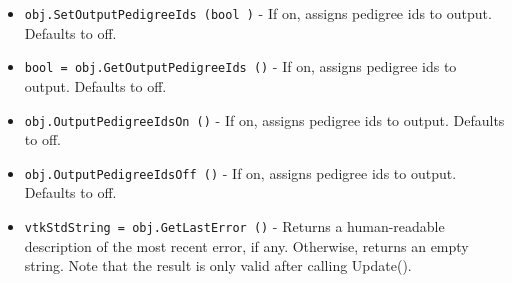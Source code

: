 \begin{itemize}
\item  \verb|obj.SetOutputPedigreeIds (bool )| -  If on, assigns pedigree ids to output. Defaults to off.

\item  \verb|bool = obj.GetOutputPedigreeIds ()| -  If on, assigns pedigree ids to output. Defaults to off.

\item  \verb|obj.OutputPedigreeIdsOn ()| -  If on, assigns pedigree ids to output. Defaults to off.

\item  \verb|obj.OutputPedigreeIdsOff ()| -  If on, assigns pedigree ids to output. Defaults to off.

\item  \verb|vtkStdString = obj.GetLastError ()| -  Returns a human-readable description of the most recent error, if any.
 Otherwise, returns an empty string.  Note that the result is only valid
 after calling Update().

\end{itemize}
